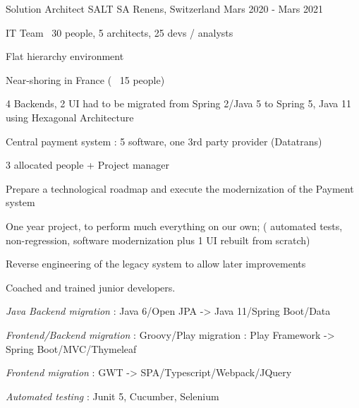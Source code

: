 \clearpage


\begin{cventries}

        \cventry
        {Solution Architect} %
        {SALT SA} %
        {Renens, Switzerland} %
        {Mars 2020 - Mars 2021} %
        {
            \experience
            {
            \begin{cvitems} %
                \item{IT Team ~30 people, 5 architects, 25 devs / analysts}
                \item{Flat hierarchy environment}
                \item{Near-shoring in France ( ~15 people)}
                \item{4 Backends, 2 UI had to be migrated from Spring 2/Java 5 to Spring 5, Java 11 using Hexagonal Architecture}
                \item{Central payment system : 5 software, one 3rd party provider (Datatrans)}
                \item{3 allocated people + Project manager}
            \end{cvitems}
            }
            {
            \begin{cvitems} %
                \item{Prepare a technological roadmap and execute  the modernization of the Payment system}
                \item{One year project, to perform much everything on our own; ( automated tests, non-regression, software modernization plus 1 UI rebuilt from scratch)}
                \item{Reverse engineering of the legacy system to allow later improvements}
                \item{Coached and trained junior developers.}
            \end{cvitems}
            }
            {
            \begin{cvitems} %
                \item{\emph{Java Backend migration} : Java 6/Open JPA -> Java 11/Spring Boot/Data}
                \item{\emph{Frontend/Backend migration} : Groovy/Play migration : Play Framework -> Spring Boot/MVC/Thymeleaf}
                \item{\emph{Frontend migration} : GWT -> SPA/Typescript/Webpack/JQuery}
                \item{\emph{Automated testing} : Junit 5, Cucumber, Selenium}
            \end{cvitems}
            }
        }


\end{cventries}
